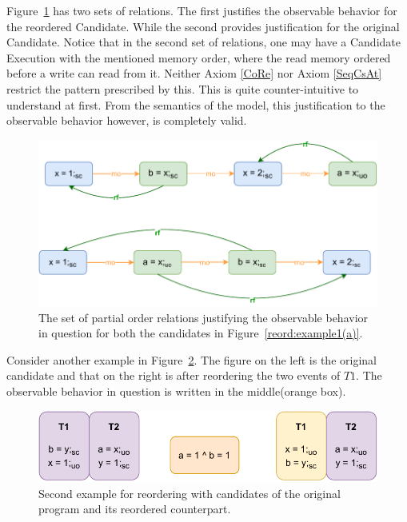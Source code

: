         Figure~\ref{reord:example1(b)} has two sets of relations. 
        The first justifies the observable behavior for the reordered Candidate. 
        While the second provides justification for the original Candidate. 
        Notice that in the second set of relations, one may have a Candidate Execution with the mentioned memory order, where the read memory ordered before a write can read from it. 
        Neither Axiom \ref{CoRe} nor Axiom \ref{SeqCsAt} restrict the pattern prescribed by this.
        This is quite counter-intuitive to understand at first. 
        From the semantics of the model, this justification to the observable behavior however, is completely valid\footnotemark. 
        \begin{figure}[H]
            \centering
            \includegraphics[scale=0.7]{4.InstructionReordering/0.Intro/ReorderingExample1(b).pdf}
            \caption{The set of partial order relations justifying the observable behavior in question for both the candidates in Figure~\ref{reord:example1(a)}.} 
            \label{reord:example1(b)}
        \end{figure}

        
        Consider another example in Figure~\ref{reord:example2(a)}.
        The figure on the left is the original candidate and that on the right is after reordering the two events of $T1$.
        The observable behavior in question is written in the middle(orange box). 
        \begin{figure}[H]
            \centering
            \includegraphics[scale=0.7]{4.InstructionReordering/0.Intro/ReorderingExample2(a).pdf}
            \caption{Second example for reordering with candidates of the original program and its reordered counterpart.} 
            \label{reord:example2(a)}
        \end{figure}
   
